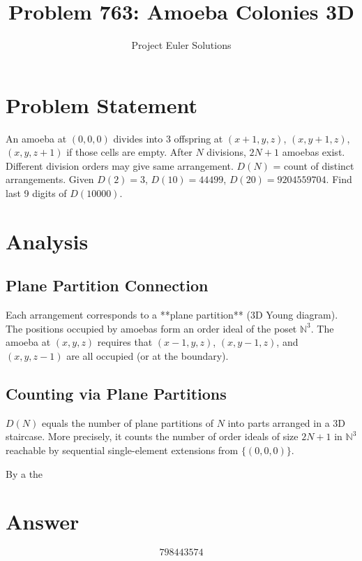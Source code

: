 \documentclass[11pt]{article}
\title{Problem 763: Amoeba Colonies 3D}
\author{Project Euler Solutions}
\date{}
\begin{document}
\maketitle
\section{Problem Statement}
An amoeba at $(0,0,0)$ divides into 3 offspring at $(x+1,y,z)$, $(x,y+1,z)$, $(x,y,z+1)$ if those cells are empty. After $N$ divisions, $2N+1$ amoebas exist. Different division orders may give same arrangement. $D(N)$ = count of distinct arrangements. Given $D(2)=3$, $D(10)=44499$, $D(20)=9204559704$. Find last 9 digits of $D(10000)$.
\section{Analysis}
\subsection*{Plane Partition Connection}

Each arrangement corresponds to a **plane partition** (3D Young diagram). The positions occupied by amoebas form an order ideal of the poset $\mathbb{N}^3$. The amoeba at $(x,y,z)$ requires that $(x-1,y,z)$, $(x,y-1,z)$, and $(x,y,z-1)$ are all occupied (or at the boundary).

\subsection*{Counting via Plane Partitions}

$D(N)$ equals the number of plane partitions of $N$ into parts arranged in a 3D staircase. More precisely, it counts the number of order ideals of size $2N+1$ in $\mathbb{N}^3$ reachable by sequential single-element extensions from $\{(0,0,0)\}$.

By a the
\section{Answer}

\[
\boxed{798443574}
\]
\end{document}

